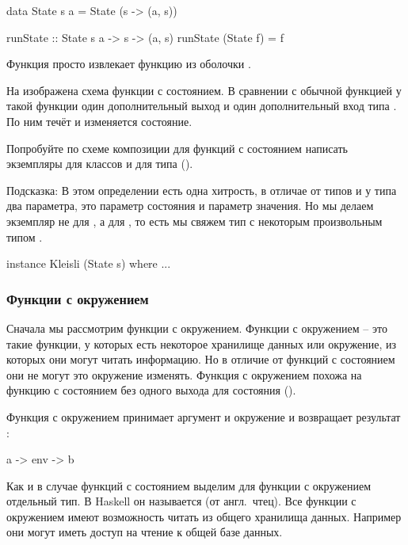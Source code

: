 \begin{code}
data State s a = State (s -> (a, s))

runState :: State s a -> s -> (a, s)
runState (State f) = f
\end{code}


Функция  просто извлекает функцию
из оболочки .

На  изображена схема функции с состоянием.
В сравнении с обычной функцией у такой функции один дополнительный 
выход и один дополнительный вход типа . По ним течёт и
изменяется состояние. 

Попробуйте по схеме композиции для функций с состоянием
написать экземпляры для классов  и 
для типа  (). 

Подсказка: В этом определении есть одна хитрость,
в отличае от типов  и \In{[a]} у типа
 два параметра, это параметр состояния 
и параметр значения. Но мы делаем экземпляр не
для , а для , то есть мы
свяжем тип с некоторым произвольным типом .

\begin{code}
instance Kleisli (State s) where
	...
\end{code}


\subsubsection{Функции с окружением}

Сначала мы рассмотрим функции с окружением. 
Функции с окружением -- это такие функции, у которых
есть некоторое хранилище данных или окружение, из которых
они могут читать информацию. Но в отличие от функций
с состоянием они не могут это окружение изменять. 
Функция с окружением похожа на функцию с состоянием без одного
выхода для состояния ().


Функция с окружением принимает аргумент  и окружение 
и возвращает результат :

\begin{code}
a -> env -> b
\end{code}

Как и в случае функций с состоянием выделим для функции
с окружением отдельный тип. В Haskell он называется 
(от англ.~чтец). Все функции с окружением имеют возможность
читать из общего хранилища данных. Например они могут иметь
доступ на чтение к общей базе данных. 

